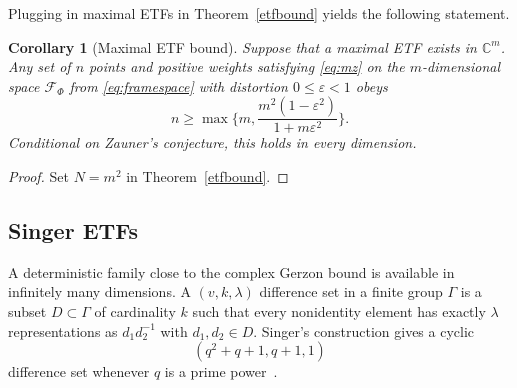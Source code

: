 \documentclass[a4paper]{amsart}
\numberwithin{equation}{section}
\newtheorem{corollary}[theorem]{Corollary}
\begin{document}
Plugging in maximal ETFs in Theorem~\ref{etfbound} yields the following statement.

\begin{corollary}[Maximal ETF bound]\label{zaunerbound}
    Suppose that a maximal ETF exists in $\mathds C^m$.
    Any set of $n$ points and positive weights satisfying \eqref{eq:mz} on the $m$-dimensional space $\mathcal F_{\Phi}$ from \eqref{eq:framespace} with distortion $0\le \varepsilon<1$ obeys
    \begin{equation}\label{eq:zaunerbound}
        n\ge
        \max\Big\{
        m,
        \frac{m^2(1-\varepsilon^2)}
             {1+m\varepsilon^2}
        \Big\}.
    \end{equation}
    Conditional on Zauner's conjecture, this holds in every dimension.
\end{corollary}

\begin{proof}
    Set $N=m^2$ in Theorem~\ref{etfbound}.
\end{proof}

\subsection{Singer ETFs}

A deterministic family close to the complex Gerzon bound is available in infinitely many dimensions. A $(v,k,\lambda)$ difference set in a finite group $\Gamma$ is a subset $D\subset\Gamma$ of cardinality $k$ such that every nonidentity element has exactly $\lambda$ representations as $d_1d_2^{-1}$ with $d_1,d_2\in D$. Singer's construction gives a cyclic
\begin{equation*}
    (q^2+q+1,q+1,1)
\end{equation*}
difference set whenever $q$ is a prime power~\cite{Singer38}.
\end{document}
